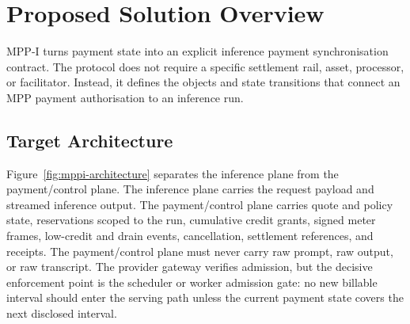 \documentclass[11pt]{article}
\newcommand{\mppi}{MPP-I}
\begin{document}
\section{Proposed Solution Overview}

\mppi{} turns payment state into an explicit inference payment synchronisation contract. The protocol does not require a specific settlement rail, asset, processor, or facilitator. Instead, it defines the objects and state transitions that connect an MPP payment authorisation to an inference run.

\subsection{Target Architecture}

Figure~\ref{fig:mppi-architecture} separates the inference plane from the payment/control plane. The inference plane carries the request payload and streamed inference output. The payment/control plane carries quote and policy state, reservations scoped to the run, cumulative credit grants, signed meter frames, low-credit and drain events, cancellation, settlement references, and receipts. The payment/control plane must never carry raw prompt, raw output, or raw transcript. The provider gateway verifies admission, but the decisive enforcement point is the scheduler or worker admission gate: no new billable interval should enter the serving path unless the current payment state covers the next disclosed interval.
\end{document}
